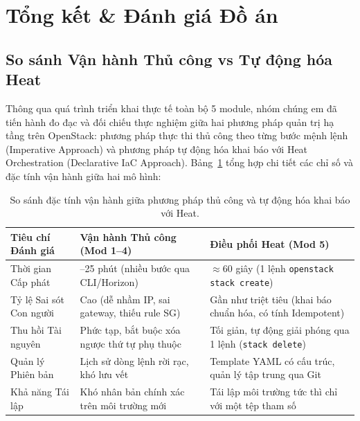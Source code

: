 \section{Tổng kết \& Đánh giá Đồ án}

\subsection{So sánh Vận hành Thủ công vs Tự động hóa Heat}
Thông qua quá trình triển khai thực tế toàn bộ 5 module, nhóm chúng em đã tiến hành đo đạc và đối chiếu thực nghiệm giữa hai phương pháp quản trị hạ tầng trên OpenStack: phương pháp thực thi thủ công theo từng bước mệnh lệnh (Imperative Approach) và phương pháp tự động hóa khai báo với Heat Orchestration (Declarative IaC Approach). Bảng~\ref{tab:comparison} tổng hợp chi tiết các chỉ số và đặc tính vận hành giữa hai mô hình:

\begin{table}[H]
\centering
\small
\begin{tabularx}{\linewidth}{|l|>{\raggedright\arraybackslash}X|>{\raggedright\arraybackslash}X|}
\hline
\textbf{Tiêu chí Đánh giá} & \textbf{Vận hành Thủ công (Mod 1--4)} & \textbf{Điều phối Heat (Mod 5)} \\ \hline
Thời gian Cấp phát & 15--25 phút (nhiều bước qua CLI/Horizon) & $\approx 60$ giây (1 lệnh \texttt{openstack stack create}) \\ \hline
Tỷ lệ Sai sót Con người & Cao (dễ nhầm IP, sai gateway, thiếu rule SG) & Gần như triệt tiêu (khai báo chuẩn hóa, có tính Idempotent) \\ \hline
Thu hồi Tài nguyên & Phức tạp, bắt buộc xóa ngược thứ tự phụ thuộc & Tối giản, tự động giải phóng qua 1 lệnh (\texttt{stack delete}) \\ \hline
Quản lý Phiên bản & Lịch sử dòng lệnh rời rạc, khó lưu vết & Template YAML có cấu trúc, quản lý tập trung qua Git \\ \hline
Khả năng Tái lập & Khó nhân bản chính xác trên môi trường mới & Tái lập môi trường tức thì chỉ với một tệp tham số \\ \hline
\end{tabularx}
\caption{So sánh đặc tính vận hành giữa phương pháp thủ công và tự động hóa khai báo với Heat.}
\label{tab:comparison}
\end{table}


